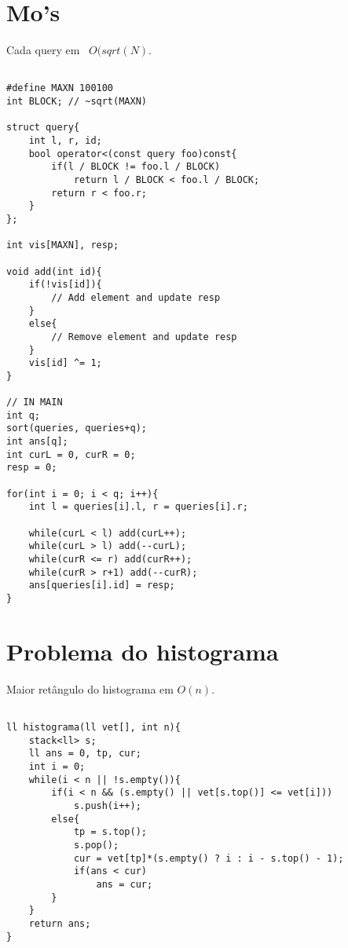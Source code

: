 \section{Mo's}
Cada query em ~$O(sqrt(N)$.
\begin{multicols}{2}
\begin{lstlisting}

#define MAXN 100100
int BLOCK; // ~sqrt(MAXN)

struct query{
	int l, r, id;
	bool operator<(const query foo)const{
		if(l / BLOCK != foo.l / BLOCK)
			return l / BLOCK < foo.l / BLOCK;
		return r < foo.r;
	}
};

int vis[MAXN], resp;

void add(int id){
	if(!vis[id]){
		// Add element and update resp
	}
	else{
		// Remove element and update resp
	}
	vis[id] ^= 1;
}

// IN MAIN
int q;
sort(queries, queries+q);
int ans[q];
int curL = 0, curR = 0;
resp = 0;

for(int i = 0; i < q; i++){
	int l = queries[i].l, r = queries[i].r;
	
	while(curL < l)	add(curL++);
	while(curL > l) add(--curL);
	while(curR <= r) add(curR++);
	while(curR > r+1) add(--curR);
	ans[queries[i].id] = resp;
}

\end{lstlisting}
\end{multicols}

\section{Problema do histograma}
Maior retângulo do histograma em $O(n)$.
\begin{multicols}{2}
	\begin{lstlisting}

ll histograma(ll vet[], int n){
	stack<ll> s;
	ll ans = 0, tp, cur;
	int i = 0;
	while(i < n || !s.empty()){
		if(i < n && (s.empty() || vet[s.top()] <= vet[i]))
			s.push(i++);
		else{
			tp = s.top();
			s.pop();
			cur = vet[tp]*(s.empty() ? i : i - s.top() - 1);
			if(ans < cur)
				ans = cur;
		}
	}
	return ans;
}

\end{lstlisting}
\end{multicols}

